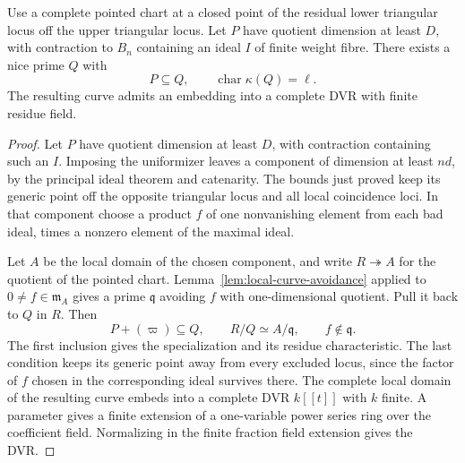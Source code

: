 \begin{proposition}\label{prop:nice-ordinary-specialization}
Use a complete pointed chart at a closed point of the
residual lower triangular locus off the upper triangular locus.
Let \(P\) have quotient dimension at least \(D\), with
contraction to \(B_n\) containing an ideal \(I\) of finite
weight fibre. There exists a nice prime \(Q\) with
\[
                    P\subseteq Q,\qquad \operatorname{char}\kappa(Q)=\ell .
\] The resulting curve admits
an embedding into a complete DVR with finite residue field.
\end{proposition}

\begin{proof}
Let \(P\) have quotient dimension at least \(D\), with contraction
containing such an \(I\). Imposing the uniformizer leaves a
component of dimension at least \(nd\), by the principal ideal
theorem and catenarity. The bounds just proved keep its generic
point off the opposite triangular locus and all local coincidence
loci. In that component choose a product \(f\) of one nonvanishing
element from each bad ideal, times a nonzero element of the maximal
ideal.

Let \(A\) be the local domain of the chosen component, and write \(R\twoheadrightarrow A\) for the quotient of the pointed chart. Lemma~\ref{lem:local-curve-avoidance} applied to \(0\ne f\in\mathfrak m_A\) gives a prime \(\mathfrak q\) avoiding \(f\) with one-dimensional quotient. Pull it back to \(Q\) in \(R\). Then
\[
 P+(\varpi)\subseteq Q,\qquad R/Q\simeq A/\mathfrak q,
 \qquad f\notin\mathfrak q .
\]
The first inclusion gives the specialization and its residue characteristic. The last condition keeps its generic point away from every excluded locus, since the factor of \(f\) chosen in the corresponding ideal survives there. The complete local domain of the
resulting curve embeds into a complete DVR \(k[[t]]\) with
\(k\) finite. A parameter gives a finite extension of a
one-variable power series ring over the coefficient field. Normalizing in the finite fraction field
extension gives the DVR.

\end{proof}



